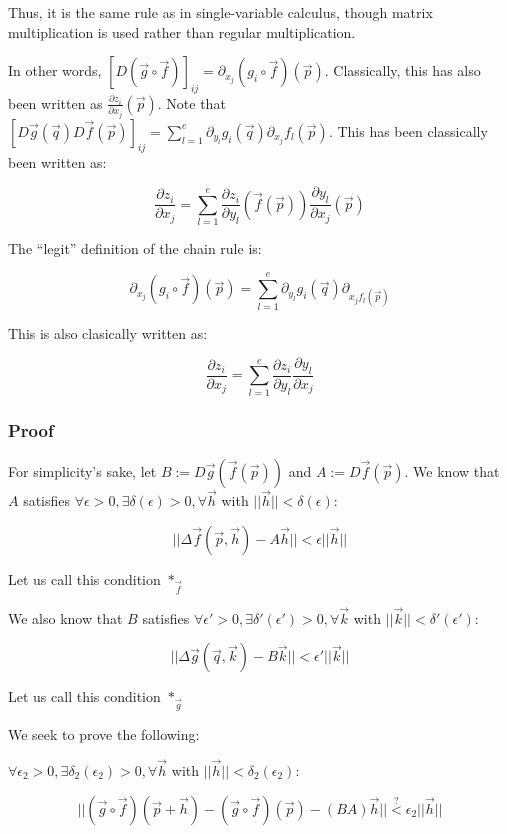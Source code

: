 \documentclass[11 pt, twoside]{article}
\begin{document}
Thus, it is the same rule as in single-variable calculus, though matrix multiplication is used rather than regular multiplication.

In other words, $[D(\vec{g} \circ
\vec{f})]_{ij} = \partial_{x_j}(g_i \circ \vec{f})(\vec{p})$. Classically, this
has also been written as $\frac{\partial z_i}{\partial x_j} (\vec{p})$. Note
that $[D\vec{g}(\vec{q}) D\vec{f}(\vec{p})]_{ij} = \sum_{l = 1}^e \partial_{y_l} g_i
(\vec{q}) \partial_{x_j} f_l (\vec{p})$. This has been classically been written
as:

\[
\frac{\partial z_i}{\partial x_j} = \sum_{l = 1}^e \frac{\partial z_i}{\partial y_l} (\vec{f}(\vec{p}))
\frac{\partial y_l}{\partial x_j} (\vec{p})
\]

The ``legit'' definition of the chain rule is:

\[
\partial_{x_j} (g_i \circ \vec{f})(\vec{p}) = \sum_{l = 1}^e \partial_{y_l}
g_i(\vec{q}) \partial_{x_j f_l (\vec{p})}
\]

This is also clasically written as:

\[
\frac{\partial z_i}{\partial x_j} = \sum_{l=1}^e \frac{\partial
z_i}{\partial y_l} \frac{\partial y_l}{\partial x_j}
\]

\subsubsection{Proof}

For simplicity's sake, let $B := D\vec{g}(\vec{f}(\vec{p}))$ and $A :=
D\vec{f}(\vec{p})$. We know that $A$ satisfies $\forall
\epsilon > 0, \exists\delta(\epsilon) > 0, \forall \vec{h}$ with
$||\vec{h}|| < \delta(\epsilon)$:

\[
||\Delta \vec{f}(\vec{p}, \vec{h}) - A \vec{h}|| < \epsilon
||\vec{h}||
\]

Let us call this condition $*_{\vec{f}}$

We also know that $B$ satisfies $\forall \epsilon' > 0, \exists 
\delta'(\epsilon') > 0, \forall \vec{k}$ with
$||\vec{k}|| < \delta'(\epsilon')$:

\[
||\Delta \vec{g}(\vec{q}, \vec{k}) - B \vec{k}|| < \epsilon'
||\vec{k}||
\]

Let us call this condition $*_{\vec{g}}$

We seek to prove the following:

$\forall \epsilon_2 > 0, \exists\delta_2(\epsilon_2) > 0, \forall
\vec{h}$ with $||\vec{h}|| < \delta_2(\epsilon_2)$:

\[
||(\vec{g} \circ \vec{f})(\vec{p} + \vec{h}) - (\vec{g} \circ
\vec{f})(\vec{p}) - (BA) \vec{h}||
\overset{?}{<} \epsilon_2 ||\vec{h}||
\]
\end{document}
